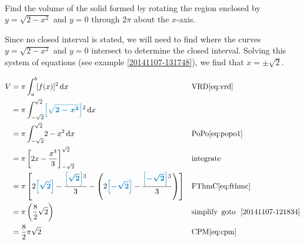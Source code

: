 \begin{example}[id:20141108-083108] \label{20141108-083108}  \hfill \\

Find the volume of the solid formed by rotating the region enclosed by $y=\sqrt{2-x^2}$ and $y=0$ through $2\pi$ about the $x$-axis.

\soln
\solnsteps


Since no closed interval is stated, we will need to find where the curves $y=\sqrt{2-x^2}$ and $y=0$ intersect to determine the closed interval.  Solving this system of equations (see example \ref{20141107-131748}), we find that $x=\pm \sqrt{2}$.

\begin{align*}
V & = \pi \displaystyle \int_{a}^{b} \! [f(x)]^2 \, \mathrm{d} x &&\text{VRD}\eqref{eq:vrd} \\
&= \pi \displaystyle \int_{-\sqrt{2}}^{\sqrt{2}} \! \farg{\sqrt{2-x^2}}^2 \, \mathrm{d} x \\ %
&= \pi \displaystyle \int_{-\sqrt{2}}^{\sqrt{2}} \! 2-x^2 \, \mathrm{d} x && \text{PoPo} \eqref{eq:popo1} \\
&= \pi \left[2x-\dfrac{x^3}{3} \right]_{-\sqrt{2}}^{\sqrt{2}}  &&\text{integrate} \\ %
&= \pi \left[2\farg{\sqrt{2}}-\dfrac{\farg{\sqrt{2}}^3}{3}-\left(2\farg{-\sqrt{2}}-\dfrac{\farg{-\sqrt{2}}^3}{3} \right) \right] && \text{FThmC} \eqref{eq:fthmc} \\
&= \pi \left(\dfrac{8}{2} \sqrt{2}\right)  &&\text{simplify} \text{\, goto \,} \, \ref{20141107-121834}\\
&= \dfrac{8}{2} \pi \sqrt{2} && \text{CPM} \eqref{eq:cpm} 
\end{align*}


\end{example}

